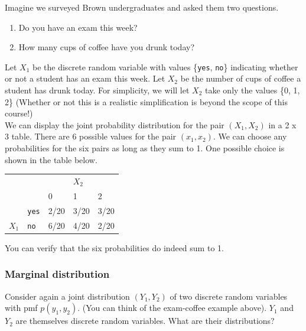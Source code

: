 \documentclass[notes.tex]{subfiles}
\begin{document}
\begin{example}Imagine we surveyed Brown undergraduates and asked them two questions. 
\begin{enumerate}
\item Do you have an exam this week? 
\item How many cups of coffee have you drunk today?
\end{enumerate}
Let $X_1$ be the discrete random variable with values \{\texttt{yes}, \texttt{no}\} indicating whether or not a student has an exam this week. Let $X_2$ be the number of cups of coffee a student has drunk today. For simplicity, we will let $X_2$ take only the values \{0, 1, 2\} (Whether or not this is a realistic simplification is beyond the scope of this course!)\\

We can display the joint probability distribution for the pair $(X_1, X_2)$ in a 2 x 3 table. There are 6 possible values for the pair $(x_1, x_2)$. We can choose any probabilities for the six pairs as long as they sum to 1. One possible choice is shown in the table below.

\begin{table}[H]
\centering
\begin{tabular}{lllll}
                       &                                 &      & $X_2$    &                           \\ \cline{3-5}
                       &                                 & 0    & 1    & 2                         \\ \cline{3-5}
\multicolumn{1}{l|}{}  & \multicolumn{1}{l|}{\texttt{yes}}    & 2/20 & 3/20 & \multicolumn{1}{l|}{3/20} \\
\multicolumn{1}{l|}{$X_1$} & \multicolumn{1}{l|}{\texttt{no}} & 6/20 & 4/20 & \multicolumn{1}{l|}{2/20} \\ \cline{3-5}                  
\end{tabular}
\end{table}
You can verify that the six probabilities do indeed sum to 1.
\end{example}

\subsubsection{Marginal distribution}
Consider again a joint distribution $(Y_1, Y_2)$ of two discrete random variables with pmf $p(y_1, y_2)$. (You can think of the exam-coffee example above). $Y_1$ and $Y_2$ are themselves discrete random variables. What are their distributions? \\
\end{document}

